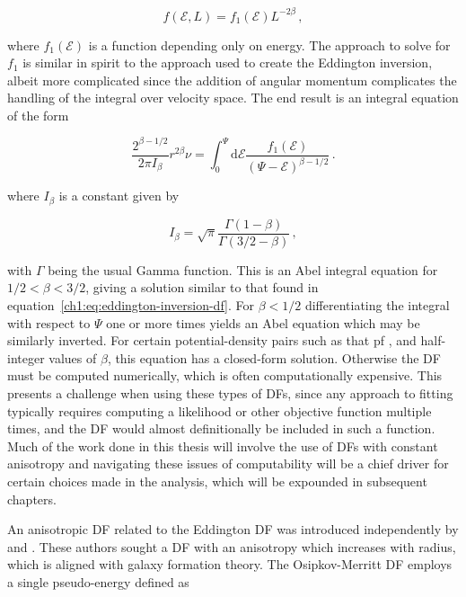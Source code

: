\begin{equation}
    \label{ch1:eq:constant-anisotropy-df}
    f(\mathcal{E}, L) = f_{1}(\mathcal{E}) L^{-2\beta}\,,
\end{equation}

\noindent where $f_{1}(\mathcal{E})$ is a function depending only on energy. The approach to solve for $f_{1}$ is similar in spirit to the approach used to create the Eddington inversion, albeit more complicated since the addition of angular momentum complicates the handling of the integral over velocity space. The end result is an integral equation of the form

\begin{equation}
    \frac{ 2^{\beta-1/2} }{ 2\pi I_{\beta} } r^{2\beta}\nu = \int_{0}^{\Psi} \mathrm{d}\mathcal{E} \frac{ f_{1}(\mathcal{E}) }{ (\Psi-\mathcal{E})^{\beta-1/2} }\,.
\end{equation}
    
\noindent where $I_{\beta}$ is a constant given by

\begin{equation}
    I_{\beta} = \sqrt{\pi}\frac{\Gamma(1-\beta)}{\Gamma(3/2-\beta)}\,,
\end{equation}

\noindent with $\Gamma$ being the usual Gamma function. This is an Abel integral equation for $1/2 < \beta < 3/2$, giving a solution similar to that found in equation~\eqref{ch1:eq:eddington-inversion-df}. For $\beta < 1/2$ differentiating the integral with respect to $\Psi$ one or more times yields an Abel equation which may be similarly inverted. For certain potential-density pairs such as that pf \textcite{hernquist90}, and half-integer values of $\beta$, this equation has a closed-form solution. Otherwise the DF must be computed numerically, which is often computationally expensive. This presents a challenge when using these types of DFs, since any approach to fitting typically requires computing a likelihood or other objective function multiple times, and the DF would almost definitionally be included in such a function. Much of the work done in this thesis will involve the use of DFs with constant anisotropy and navigating these issues of computability will be a chief driver for certain choices made in the analysis, which will be expounded in subsequent chapters.

An anisotropic DF related to the Eddington DF was introduced independently by \textcite{osipkov79} and \textcite{merritt85}. These authors sought a DF with an anisotropy which increases with radius, which is aligned with galaxy formation theory. The Osipkov-Merritt DF employs a single pseudo-energy defined as 

